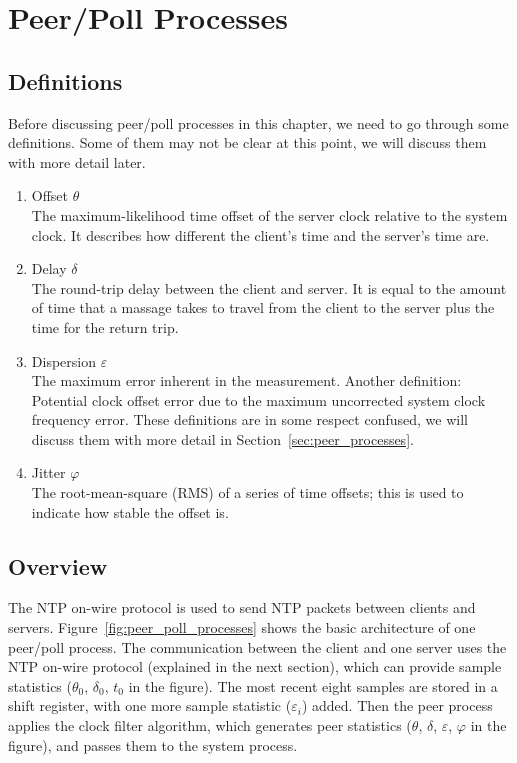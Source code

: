 \chapter{Peer/Poll Processes}
\label{cha:peer/poll_processes}

\section{Definitions}%
\label{sec:peer/poll_concepts}
Before discussing peer/poll processes in this chapter, we need to go through
some definitions. Some of them may not be clear at this point, we will discuss
them with more detail later.
\begin{enumerate}
    \item Offset $\theta$\\
        The maximum-likelihood time offset of the server clock relative to the
        system clock. It describes how different the client's time
        and the server's time are.
    \item Delay $\delta$\\
        The round-trip delay between the client and server. It is equal to the
        amount of time that a massage takes to travel from the client to the
        server plus the time for the return trip.
    \item Dispersion $\varepsilon$\\
        The maximum error inherent in the measurement.
        Another definition: Potential clock offset error due to the maximum
        uncorrected system clock frequency error.  These definitions are in
        some respect confused, we will discuss them with more detail in
        Section~\ref{sec:peer_processes}.
    \item Jitter $\varphi$\\
        The root-mean-square (RMS) of a series of time offsets; this is used to
        indicate how stable the offset is.
\end{enumerate}

\section{Overview}%
\label{sec:peer_poll_overview}
The NTP on-wire protocol is used to send NTP packets between clients and
servers.  Figure~\ref{fig:peer_poll_processes} shows the basic architecture of
one peer/poll process. The communication between the client and one server
uses the NTP on-wire protocol (explained in the next section), which can
provide sample statistics ($\theta_0$, $\delta_0$, $t_0$ in the figure).  The most
recent eight samples are stored in a shift register, with one more sample
statistic ($\varepsilon_i$) added. Then the peer process applies the clock
filter algorithm, which generates peer statistics ($\theta$, $\delta$,
$\varepsilon$, $\varphi$ in the figure), and passes them to the system process.

